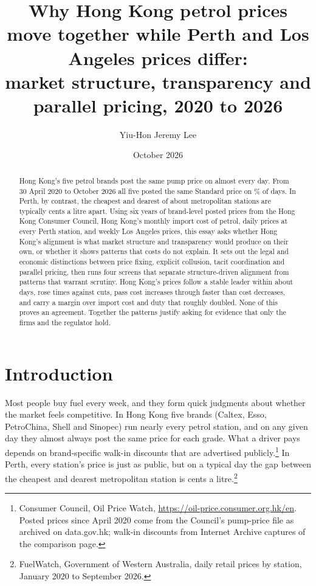 \documentclass[11pt]{article}
\title{Why Hong Kong petrol prices move together while Perth and Los Angeles prices differ:\\
\large market structure, transparency and parallel pricing, 2020 to 2026}
\author{Yiu-Hon Jeremy Lee}
\date{October 2026}
\begin{document}
\maketitle

\begin{abstract}
Hong Kong's five petrol brands post the same pump price on almost every day. From 30 April 2020 to October 2026 all five posted the same Standard price on \hkShareEqual\% of days. In Perth, by contrast, the cheapest and dearest of about \perthStations{} metropolitan stations are typically \perthRange{} cents a litre apart. Using six years of brand-level posted prices from the Hong Kong Consumer Council, Hong Kong's monthly import cost of petrol, daily prices at every Perth station, and weekly Los Angeles prices, this essay asks whether Hong Kong's alignment is what market structure and transparency would produce on their own, or whether it shows patterns that costs do not explain. It sets out the legal and economic distinctions between price fixing, explicit collusion, tacit coordination and parallel pricing, then runs four screens that separate structure-driven alignment from patterns that warrant scrutiny. Hong Kong's prices follow a stable leader within about \hkMedianLag{} days, rose \hkEpisodesUp{} times against \hkEpisodesDown{} cuts, pass cost increases through faster than cost decreases, and carry a margin over import cost and duty that roughly doubled. None of this proves an agreement. Together the patterns justify asking for evidence that only the firms and the regulator hold.
\end{abstract}

\section{Introduction}

Most people buy fuel every week, and they form quick judgments about whether the market feels competitive. In Hong Kong five brands (Caltex, Esso, PetroChina, Shell and Sinopec) run nearly every petrol station, and on any given day they almost always post the same price for each grade. What a driver pays depends on brand-specific walk-in discounts that are advertised publicly.\footnote{Consumer Council, Oil Price Watch, \url{https://oil-price.consumer.org.hk/en}. Posted prices since April 2020 come from the Council's pump-price file as archived on data.gov.hk; walk-in discounts from Internet Archive captures of the comparison page.} In Perth, every station's price is just as public, but on a typical day the gap between the cheapest and dearest metropolitan station is \perthRange{} cents a litre.\footnote{FuelWatch, Government of Western Australia, daily retail prices by station, January 2020 to September 2026.}
\end{document}

